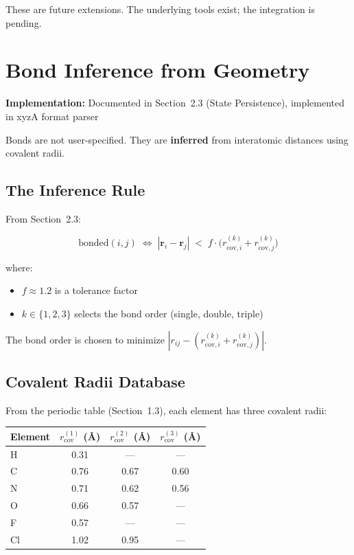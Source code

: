 \documentclass[11pt]{article}
\begin{document}
These are future extensions. The underlying tools exist; the integration is pending.

\section{Bond Inference from Geometry}

\textbf{Implementation:} Documented in Section~2.3 (State Persistence), implemented in xyzA format parser

Bonds are not user-specified. They are \textbf{inferred} from interatomic distances using covalent radii.

\subsection{The Inference Rule}

From Section~2.3:

\begin{equation}
\text{bonded}(i, j) \;\Longleftrightarrow\; |\mathbf{r}_i - \mathbf{r}_j| \;<\; f \cdot \bigl(r_{\text{cov},i}^{(k)} + r_{\text{cov},j}^{(k)}\bigr)
\end{equation}

where:
\begin{itemize}
\item $f \approx 1.2$ is a tolerance factor
\item $k \in \{1, 2, 3\}$ selects the bond order (single, double, triple)
\end{itemize}

The bond order is chosen to minimize $|r_{ij} - (r_{\text{cov},i}^{(k)} + r_{\text{cov},j}^{(k)})|$.

\subsection{Covalent Radii Database}

From the periodic table (Section~1.3), each element has three covalent radii:

\begin{center}
\small
\begin{tabular}{lccc}
\toprule
Element & $r_{\text{cov}}^{(1)}$ (\AA) & $r_{\text{cov}}^{(2)}$ (\AA) & $r_{\text{cov}}^{(3)}$ (\AA) \\
\midrule
H & 0.31 & — & — \\
C & 0.76 & 0.67 & 0.60 \\
N & 0.71 & 0.62 & 0.56 \\
O & 0.66 & 0.57 & — \\
F & 0.57 & — & — \\
Cl & 1.02 & 0.95 & — \\
\bottomrule
\end{tabular}
\end{center}
\end{document}
